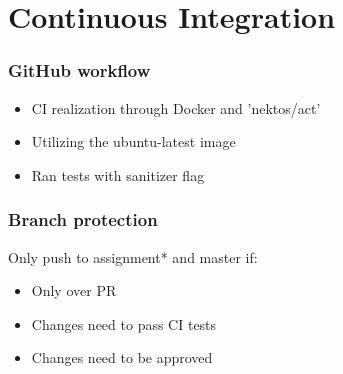 \section{Continuous Integration}

\begin{frame}
    \frametitle{GitHub workflow}

    \begin{itemize}
        \item CI realization through Docker and 'nektos/act'
        \item Utilizing the ubuntu-latest image
        \item Ran tests with sanitizer flag
    \end{itemize}

\end{frame}

\begin{frame}
    \frametitle{Branch protection}

    Only push to assignment* and master if:
    \begin{itemize}
        \item Only over PR
        \item Changes need to pass CI tests
        \item Changes need to be approved
    \end{itemize}

\end{frame}
